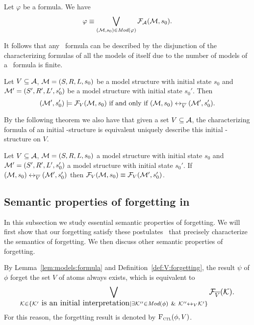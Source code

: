 \documentclass{article}
\begin{document}
\begin{lemma}\label{lem:models:formula}
  Let $\varphi$ be a formula. We have
  \begin{equation}
    \varphi\equiv \bigvee_{({\cal M}, s_0)\in\textit{Mod}(\varphi)}{\cal F}_{\cal A}({\cal M}, s_0).
\end{equation}
\end{lemma}
It follows that any \CTL\ formula can be described by the disjunction of the characterizing formulas of all the models of itself due to the number of models of a \CTL\ formula is finite.

\begin{theorem}\label{CF}
Let $V\subseteq {\cal A}$, ${\cal M}=(S,R,L,s_0)$ be a model structure with initial state $s_0$
and ${\cal M}'=(S',R', L',s_0')$ be a model structure with initial state $s_0'$.
Then  $$({\cal M}',s_0') \models {\cal F}_V({\cal M},s_0)
\mbox{ if and only if }
({\cal M},s_0) \leftrightarrow_{\overline V} ({\cal M}',s_0').$$
\end{theorem}

By the following theorem we also have that given a set $V\subseteq {\cal A}$, the characterizing formula of an initial \MPK-structure is equivalent uniquely describe this initial \MPK-structure on $V$.
\begin{theorem}\label{thm:VBChFEQ}
Let $V\subseteq {\cal A}$, ${\cal M}=(S,R,L,s_0)$ a model structure with initial state $s_0$
and ${\cal M}'=(S',R', L',s_0')$ a model structure with initial state $s_0'$.
If $({\cal M},s_0) \leftrightarrow_{\overline V} ({\cal M}',s_0')$ then ${\cal F}_V({\cal M}, s_0) \equiv {\cal F}_V({\cal M}', s_0')$.
\end{theorem}



\subsection{Semantic properties of forgetting in \CTL}
In this subsection we study essential semantic properties of forgetting. We will first show that our forgetting satisfy these postulates~\cite{Yan:AIJ:2009} that precisely characterize the semantics of forgetting. We then discuss other semantic properties of forgetting.

By Lemma~\ref{lem:models:formula} and Definition~\ref{def:V:forgetting}, the result $\psi$ of $\phi$ forget the set $V$ of atoms always exists, which
is equivalent to
\begin{equation*}
\resizebox{.91\linewidth}{!}{$
\displaystyle
  \bigvee_{{\cal K}\in  \{{\cal K}'\mbox{ is an initial interpretation}\mid \exists {\cal K}''\in\Mod(\phi)\ \&\ {\cal K}''\lrto_V{\cal K}'\}} {\cal F}_{\overline V}({\cal K}).
  $}
\end{equation*}
For this reason, the forgetting result is denoted by ${\textsc{F}_{\textsc{ctl}}}(\phi,V)$.
\end{document}
